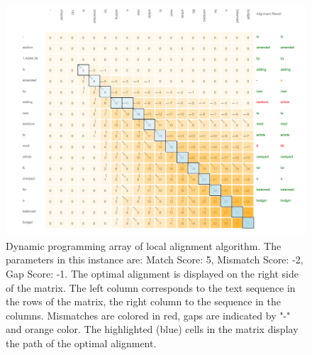 \documentclass[12pt]{article} %
\begin{document}
\begin{figure}[ht!]
	\centering
	\includegraphics[width=1.05\textwidth]{figures/sm.png}
    \caption{Dynamic programming array of local alignment algorithm. The
    parameters in this instance are: Match Score: 5, Mismatch Score: -2, Gap
Score: -1. The optimal alignment is displayed on the right side of the matrix.
The left column corresponds to the text sequence in the rows of the matrix, the
right column to the sequence in the columns. Mismatches are colored in red, gaps
are indicated by "-" and orange color. The highlighted (blue) cells in the matrix display the path of the optimal alignment.}
    \label{fig:score_matrix}
\end{figure}
\end{document}
